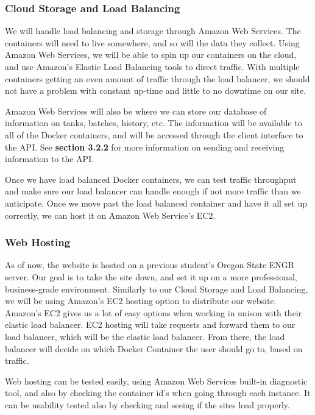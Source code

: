        \subsubsection{Cloud Storage and Load Balancing}
            We will handle load balancing and storage through Amazon Web Services.
            The containers will need to live somewhere, and so will the data they collect. Using Amazon Web Services, we will be able to spin up our containers on the cloud, and use Amazon's Elastic Load Balancing tools to direct traffic. 
            With multiple containers getting an even amount of traffic through the load balancer, we should not have a problem with constant up-time and little to no downtime on our site. 
            
            Amazon Web Services will also be where we can store our database of information on tanks, batches, history, etc. The information will be available to all of the Docker containers, and will be accessed through the client interface to the API. See \textbf{section 3.2.2} for more information on sending and receiving information to the API.
    
            Once we have load balanced Docker containers, we can test traffic throughput and make sure our load balancer can handle enough if not more traffic than we anticipate. Once we move past the load balanced container and have it all set up correctly, we can host it on Amazon Web Service's EC2.  
        
        \subsubsection{Web Hosting}
            As of now, the website is hosted on a previous student's Oregon State ENGR server. Our goal is to take the site down, and set it up on a more professional, business-grade environment.
            Similarly to our Cloud Storage and Load Balancing, we will be using Amazon's EC2 hosting option to distribute our website. Amazon's EC2 gives us a lot of easy options when working in unison with their elastic load balancer. EC2 hosting will take requests and forward them to our load balancer, which will be the elastic load balancer. From there, the load balancer will decide on which Docker Container the user should go to, based on traffic.
            
            Web hosting can be tested easily, using Amazon Web Services built-in diagnostic tool, and also by checking the container id's when going through each instance. It can be usability tested also by checking and seeing if the sites load properly. 
            
